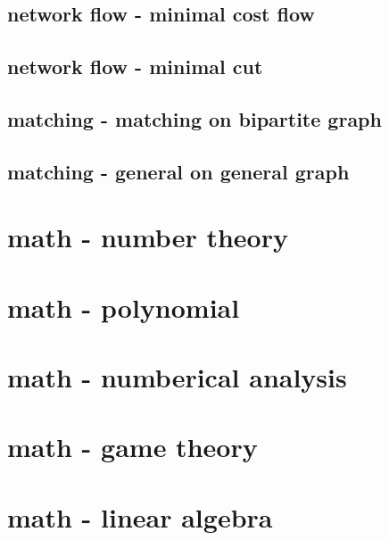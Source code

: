 \documentclass[UTF8, a4paper, titlepage, twoside]{ctexart}
\begin{document}
\subsection{network flow - minimal cost flow}



\subsection{network flow - minimal cut}

\subsection{matching - matching on bipartite graph}




\subsection{matching - general on general graph}


\section{math - number theory}


\section{math - polynomial}

\section{math - numberical analysis}

\section{math - game theory}


\section{math - linear algebra}



\end{document}
